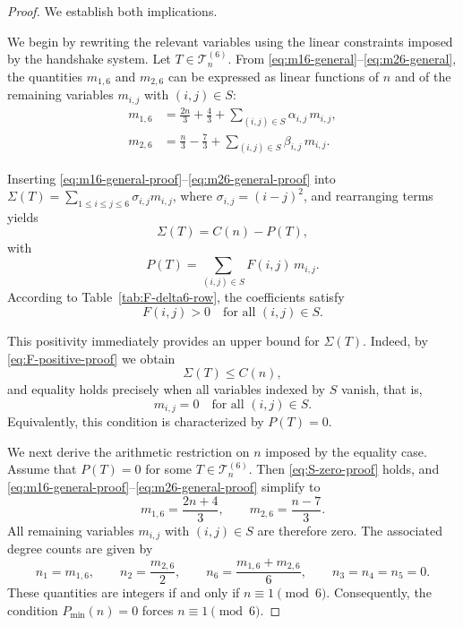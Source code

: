 \documentclass[preprint,12pt]{elsarticle}
\begin{document}
\begin{proof}
We establish both implications.

\medskip
We begin by rewriting the relevant variables using the linear constraints imposed by the handshake system.
Let $T\in\mathcal{T}_n^{(6)}$.
From \eqref{eq:m16-general}--\eqref{eq:m26-general},
the quantities $m_{1,6}$ and $m_{2,6}$ can be expressed as linear functions of $n$
and of the remaining variables $m_{i,j}$ with $(i,j)\in S$:
\begin{align}
m_{1,6}
&=
\frac{2n}{3}+\frac{4}{3}
+\sum_{(i,j)\in S} \alpha_{i,j}\,m_{i,j},
\label{eq:m16-general-proof}
\\
m_{2,6}
&=
\frac{n}{3}-\frac{7}{3}
+\sum_{(i,j)\in S} \beta_{i,j}\,m_{i,j}.
\label{eq:m26-general-proof}
\end{align}

Inserting \eqref{eq:m16-general-proof}--\eqref{eq:m26-general-proof} into
$\Sigma(T)=\sum_{1\le i\le j\le 6}\sigma_{i,j}m_{i,j}$, where
$\sigma_{i,j}=(i-j)^2$,
and rearranging terms yields
\[
\Sigma(T)=C(n)-P(T),
\]
with
\[
P(T)=\sum_{(i,j)\in S}F(i,j)\,m_{i,j}.
\]
According to Table~\ref{tab:F-delta6-row}, the coefficients satisfy
\begin{equation}
F(i,j)>0 \quad \text{for all }(i,j)\in S.
\label{eq:F-positive-proof}
\end{equation}

\medskip
This positivity immediately provides an upper bound for $\Sigma(T)$.
Indeed, by \eqref{eq:F-positive-proof} we obtain
\[
\Sigma(T)\le C(n),
\]
and equality holds precisely when all variables indexed by $S$ vanish, that is,
\begin{equation}
m_{i,j}=0 \quad \text{for all }(i,j)\in S.
\label{eq:S-zero-proof}
\end{equation}
Equivalently, this condition is characterized by $P(T)=0$.

\medskip
We next derive the arithmetic restriction on $n$ imposed by the equality case.
Assume that $P(T)=0$ for some $T\in\mathcal{T}_n^{( 6)}$.
Then \eqref{eq:S-zero-proof} holds, and
\eqref{eq:m16-general-proof}--\eqref{eq:m26-general-proof} simplify to
\begin{equation}
m_{1,6}=\frac{2n+4}{3},
\qquad
m_{2,6}=\frac{n-7}{3}.
\label{eq:m16m26-reduced-proof}
\end{equation}
All remaining variables $m_{i,j}$ with $(i,j)\in S$ are therefore zero.
The associated degree counts are given by
\[
n_1=m_{1,6},\qquad
n_2=\frac{m_{2,6}}{2},\qquad
n_6=\frac{m_{1,6}+m_{2,6}}{6},
\qquad
n_3=n_4=n_5=0.
\]
These quantities are integers if and only if $n\equiv 1 \pmod 6$.
Consequently, the condition $P_{\min}(n)=0$ forces $n\equiv 1\pmod 6$.


\end{proof}
\end{document}
